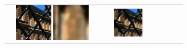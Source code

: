 \begin{figure}[ht!]
{\begin{tabular}{cccccc}
\begin{minipage}{0.180\textwidth}
        \end{minipage} &
        \begin{minipage}{0.180\textwidth}
            \centering
            \includegraphics[width=0.46\textwidth, height=0.46\textwidth,cfbox=blue 1pt 0pt]{img/qual/Palais_du_Luxembourg/DistgSSR/SR.png}
            \includegraphics[width=0.46\textwidth, height=0.46\textwidth,cfbox=red 1pt 0pt]{img/qual/Palais_du_Luxembourg/DistgSSR/SR.LAM.png}
        \end{minipage} &
        \begin{minipage}{0.180\textwidth}
            \centering
            \includegraphics[width=0.46\textwidth, height=0.46\textwidth,cfbox=blue 1pt 0pt]{img/qual/Palais_du_Luxembourg/LFT/SR.png}

\end{minipage}
\end{tabular}}
\end{figure}
